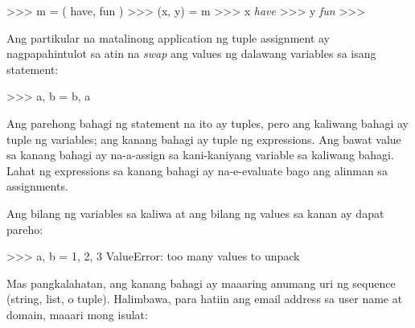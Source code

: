 \documentclass[10pt,]{book}
\newenvironment{Shaded}{}{}
\newcommand{\CommentTok}[1]{\textcolor[rgb]{0.38,0.63,0.69}{\textit{#1}}}
\newcommand{\DecValTok}[1]{\textcolor[rgb]{0.25,0.63,0.44}{#1}}
\newcommand{\NormalTok}[1]{#1}
\newcommand{\OperatorTok}[1]{\textcolor[rgb]{0.40,0.40,0.40}{#1}}
\newcommand{\PreprocessorTok}[1]{\textcolor[rgb]{0.74,0.48,0.00}{#1}}
\newcommand{\StringTok}[1]{\textcolor[rgb]{0.25,0.44,0.63}{#1}}
\begin{document}
\begin{Shaded}
\begin{Highlighting}[]
\OperatorTok{\textgreater{}\textgreater{}\textgreater{}}\NormalTok{ m }\OperatorTok{=}\NormalTok{ ( }\StringTok{\textquotesingle{}have\textquotesingle{}}\NormalTok{, }\StringTok{\textquotesingle{}fun\textquotesingle{}}\NormalTok{ )}
\OperatorTok{\textgreater{}\textgreater{}\textgreater{}}\NormalTok{ (x, y) }\OperatorTok{=}\NormalTok{ m}
\OperatorTok{\textgreater{}\textgreater{}\textgreater{}}\NormalTok{ x}
\CommentTok{\textquotesingle{}have\textquotesingle{}}
\OperatorTok{\textgreater{}\textgreater{}\textgreater{}}\NormalTok{ y}
\CommentTok{\textquotesingle{}fun\textquotesingle{}}
\OperatorTok{\textgreater{}\textgreater{}\textgreater{}}
\end{Highlighting}
\end{Shaded}

Ang partikular na matalinong application ng tuple assignment ay
nagpapahintulot sa atin na \emph{swap} ang values ng dalawang variables
sa isang statement:

\begin{Shaded}
\begin{Highlighting}[]
\OperatorTok{\textgreater{}\textgreater{}\textgreater{}}\NormalTok{ a, b }\OperatorTok{=}\NormalTok{ b, a}
\end{Highlighting}
\end{Shaded}

Ang parehong bahagi ng statement na ito ay tuples, pero ang kaliwang
bahagi ay tuple ng variables; ang kanang bahagi ay tuple ng expressions.
Ang bawat value sa kanang bahagi ay na-a-assign sa kani-kaniyang
variable sa kaliwang bahagi. Lahat ng expressions sa kanang bahagi ay
na-e-evaluate bago ang alinman sa assignments.

Ang bilang ng variables sa kaliwa at ang bilang ng values sa kanan ay
dapat pareho:

 

\begin{Shaded}
\begin{Highlighting}[]
\OperatorTok{\textgreater{}\textgreater{}\textgreater{}}\NormalTok{ a, b }\OperatorTok{=} \DecValTok{1}\NormalTok{, }\DecValTok{2}\NormalTok{, }\DecValTok{3}
\PreprocessorTok{ValueError}\NormalTok{: too many values to unpack}
\end{Highlighting}
\end{Shaded}

Mas pangkalahatan, ang kanang bahagi ay maaaring anumang uri ng sequence
(string, list, o tuple). Halimbawa, para hatiin ang email address sa
user name at domain, maaari mong isulat:
\end{document}
